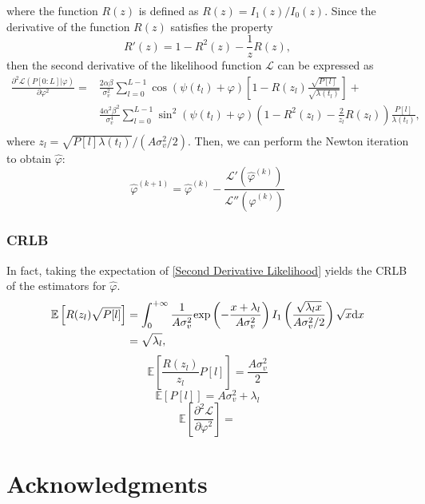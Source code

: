 \documentclass[12pt,draftclsnofoot,journal,onecolumn]{IEEEtran}
\theoremstyle{nonumberplain}
\def \exp {\text{exp}}
\begin{document}
    where the function $R(z)$ is defined as $R(z) = I_1(z)/I_0(z)$. Since the derivative of the function $R(z)$ satisfies the property
    \begin{equation}
        R'(z)=1-R^2(z)-\frac{1}{z}R(z),
    \end{equation}
    then the second derivative of the likelihood function $\mathcal{L}$ can be expressed as
    \begin{equation}
        \begin{aligned}
        \frac{\partial^2 \mathcal{L}(P[0:L] | \varphi)}{\partial \varphi^2}  = &  \frac{2\alpha\beta}{\sigma_v^2} \sum_{l=0}^{L-1}{\cos(\psi(t_l)+\varphi)}\left[1 - R\left(z_l\right) \frac{\sqrt{P[l]}}{\sqrt{\lambda(t_l)}}\right] + \\
        & \frac{4\alpha^2\beta^2}{\sigma_v^4}\sum_{l=0}^{L-1}{\sin^2(\psi(t_l)+\varphi) \left(1-R^2(z_l) -\frac{2}{z_l}R(z_l)\right)\frac{P[l]}{\lambda(t_l)} },\\
        \end{aligned}
        \label{Second Derivative Likelihood}
    \end{equation}
    where $z_l = \sqrt{P[l]\lambda(t_l)}/(A\sigma_v^2/2)$. Then, we can perform the Newton iteration to obtain $\hat{\varphi}$:
    \begin{equation}
        \hat{\varphi}^{(k+1)} = \hat{\varphi}^{(k)} - \frac{\mathcal{L}'(\hat{\varphi}^{(k)})}{\mathcal{L}''(\hat{\varphi}^{(k)})}
    \end{equation}

\subsubsection{CRLB}
    In fact, taking the expectation of \eqref{Second Derivative Likelihood} yields the CRLB of the estimators for $\hat{\varphi}$.
    \begin{equation}
        \begin{aligned}
            \mathbb{E}\left[R(z_l) \sqrt{P[l]}\right] & = \int_{0}^{+\infty}{\frac{1}{A\sigma_v^2}\exp\left(-\frac{x+\lambda_l}{A\sigma_v^2}\right)I_1\left(\frac{\sqrt{\lambda_l x}}{A\sigma_v^2/2}\right)\sqrt{x}{\rm d}x}\\
            & = \sqrt{\lambda_l},
        \end{aligned}
    \end{equation}
    \begin{equation}
        \mathbb{E}\left[\frac{R(z_l)}{z_l} P[l]\right] = \frac{A\sigma_v^2}{2}
    \end{equation}
    \begin{equation}
        \mathbb{E}\left[P[l]\right] = A\sigma_v^2 + \lambda_l
    \end{equation}
    \begin{equation}
        \mathbb{E}\left[\frac{\partial^2\mathcal{L}}{\partial\varphi^2}\right] = 
    \end{equation}



\appendices


\section*{Acknowledgments}


\footnotesize
\balance 


\end{document}
